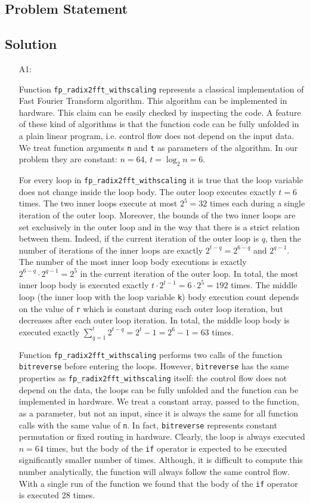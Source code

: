 \documentclass[12pt,a4paper,titlepage,oneside]{article}
\begin{document}
\subsection{Problem Statement}


\subsection{Solution}
\begin{itemize}
\item[A1:] 

Function \texttt{fp\_radix2fft\_withscaling} represents a classical implementation of Fast Fourier Transform algorithm.
This algorithm can be implemented in hardware.
This claim can be easily checked by inspecting the code.
A feature of these kind of algorithms is that the function code can be fully unfolded in a plain linear program, i.e. control flow does not depend on the input data.
We treat function arguments \texttt{n} and \texttt{t} as parameters of the algorithm.
In our problem they are constant: $n=64$, $t=\log_2 n = 6$.

For every loop in \texttt{fp\_radix2fft\_withscaling} it is true that the loop variable does not change inside the loop body.
The outer loop executes exactly $t=6$ times.
The two inner loops execute at most $2^5=32$ times each during a single iteration of the outer loop.
Moreover, the bounds of the two inner loops are set exclusively in the outer loop and in the way that there is a strict relation between them.
Indeed, if the current iteration of the outer loop is $q$, then the number of iterations of the inner loops are exactly $2^{t-q}=2^{6-q}$ and $2^{q-1}$.
The number of the most inner loop body executions is exactly $2^{6-q}\cdot2^{q-1}=2^5$ in the current iteration of the outer loop.
In total, the most inner loop body is executed exactly $t\cdot2^{t-1}=6\cdot2^5=192$ times.
The middle loop (the inner loop with the loop variable \texttt{k}) body execution count depends on the value of \texttt{r} which is constant during each outer loop iteration, but decreases after each outer loop iteration.
In total, the middle loop body is executed exactly $\sum_{q=1}^t 2^{t-q} = 2^t -1 = 2^6-1 = 63$ times.

Function \texttt{fp\_radix2fft\_withscaling} performs two calls of the function \texttt{bitreverse} before entering the loops.
However, \texttt{bitreverse} has the same properties as \texttt{fp\_radix2fft\_withscaling} itself: the control flow does not depend on the data, the loops can be fully unfolded and the function can be implemented in hardware.
We treat a constant array, passed to the function, as a parameter, but not an input, since it is always the same for all function calls with the same value of \texttt{n}.
In fact, \texttt{bitreverse} represents constant permutation or fixed routing in hardware.
Clearly, the loop is always executed $n=64$ times, but the body of the \texttt{if} operator is expected to be executed significantly smaller number of times.
Although, it is difficult to compute this number analytically, the function will always follow the same control flow.
With a single run of the function we found that the body of the \texttt{if} operator is executed 28 times.


\end{itemize}
\end{document}
